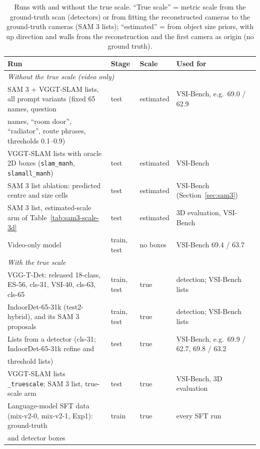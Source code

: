\begin{table}[t]
\centering
\caption{Runs with and without the true scale. ``True scale'' = metric scale from the ground-truth scan (detectors) or
from fitting the reconstructed cameras to the ground-truth cameras (SAM 3 lists); ``estimated'' = from object size
priors, with up direction and walls from the reconstruction and the first camera as origin (no ground truth).}
\label{tab:sam3-scale-use}
\small
\begin{tabular}{llll}
\toprule
Run & Stage & Scale & Used for \\
\midrule
\multicolumn{4}{l}{\emph{Without the true scale (video only)}} \\
SAM 3 + VGGT-SLAM lists, all prompt variants (fixed 65 names, question & test & estimated & VSI-Bench, e.g.\ 69.0 / 62.9 \\
\quad names, ``room door'', ``radiator'', route phrases, thresholds 0.1--0.9) & & & \\
VGGT-SLAM lists with oracle 2D boxes (\texttt{slam\_manh}, \texttt{slamall\_manh}) & test & estimated & VSI-Bench \\
SAM 3 list ablation: predicted centre and size cells & test & estimated & VSI-Bench (Section~\ref{sec:sam3}) \\
SAM 3 list, estimated-scale arm of Table~\ref{tab:sam3-scale-3d} & test & estimated & 3D evaluation, VSI-Bench \\
Video-only model & train, test & no boxes & VSI-Bench 69.4 / 63.7 \\
\midrule
\multicolumn{4}{l}{\emph{With the true scale}} \\
VGG-T-Det: released 18-class, ES-56, cls-31, VSI-40, cls-63, cls-65 & train, test & true & detection; VSI-Bench lists \\
IndoorDet-65-31k (test2-hybrid), and its SAM 3 proposals & train, test & true & detection; VSI-Bench lists \\
Lists from a detector (cls-31; IndoorDet-65-31k refine and & test & true & VSI-Bench, e.g.\ 69.9 / 62.7, 69.8 / 63.2 \\
\quad threshold lists) & & & \\
VGGT-SLAM lists \texttt{\_truescale}; SAM 3 list, true-scale arm & test & true & VSI-Bench, 3D evaluation \\
Language-model SFT data (mix-v2-0, mix-v2-1, Exp1): ground-truth & train & true & every SFT run \\
\quad and detector boxes & & & \\
\bottomrule
\end{tabular}
\end{table}
